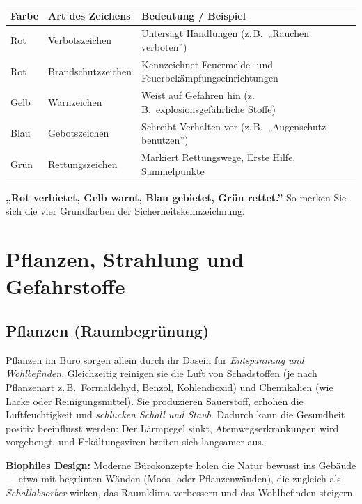 \documentclass[11pt, a4paper]{article}
\begin{document}
\begin{center}
\begin{tabular}{p{3.0cm} p{4.0cm} p{4.7cm}}
\toprule
\textbf{Farbe} & \textbf{Art des Zeichens} & \textbf{Bedeutung / Beispiel}\\
\midrule
Rot & Verbotszeichen & Untersagt Handlungen (z.\,B.\ „Rauchen verboten”)\\
Rot & Brandschutzzeichen & Kennzeichnet Feuermelde- und Feuerbekämpfungseinrichtungen\\
Gelb & Warnzeichen & Weist auf Gefahren hin (z.\,B.\ explosionsgefährliche Stoffe)\\
Blau & Gebotszeichen & Schreibt Verhalten vor (z.\,B.\ „Augenschutz benutzen”)\\
Grün & Rettungszeichen & Markiert Rettungswege, Erste Hilfe, Sammelpunkte\\
\bottomrule
\end{tabular}
\end{center}

\begin{eselsbruecke}
\textbf{„Rot verbietet, Gelb warnt, Blau gebietet, Grün rettet.”} So merken Sie sich die
vier Grundfarben der Sicherheitskennzeichnung.
\end{eselsbruecke}

\section{Pflanzen, Strahlung und Gefahrstoffe}

\subsection{Pflanzen (Raumbegrünung)}

Pflanzen im Büro sorgen allein durch ihr Dasein für \emph{Entspannung und Wohlbefinden}.
Gleichzeitig reinigen sie die Luft von Schadstoffen (je nach Pflanzenart z.\,B.\
Formaldehyd, Benzol, Kohlendioxid) und Chemikalien (wie Lacke oder Reinigungsmittel). Sie
produzieren Sauerstoff, erhöhen die Luftfeuchtigkeit und \emph{schlucken Schall und
Staub}. Dadurch kann die Gesundheit positiv beeinflusst werden: Der Lärmpegel sinkt,
Atemwegserkrankungen wird vorgebeugt, und Erkältungsviren breiten sich langsamer aus.

\begin{beispiel}
\textbf{Biophiles Design:} Moderne Bürokonzepte holen die Natur bewusst ins Gebäude ---
etwa mit begrünten Wänden (Moos- oder Pflanzenwänden), die zugleich als
\emph{Schallabsorber} wirken, das Raumklima verbessern und das Wohlbefinden steigern.
\end{beispiel}
\end{document}
